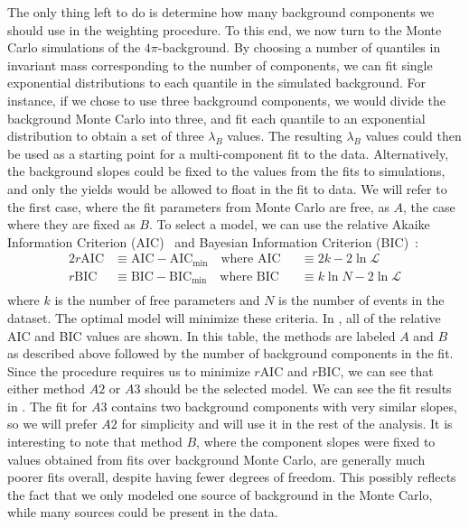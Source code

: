 The only thing left to do is determine how many background components we should use in the weighting procedure. To this end, we now turn to the Monte Carlo simulations of the $4\pi$-background. By choosing a number of quantiles in invariant mass corresponding to the number of components, we can fit single exponential distributions to each quantile in the simulated background. For instance, if we chose to use three background components, we would divide the background Monte Carlo into three, and fit each quantile to an exponential distribution to obtain a set of three $\lambda_B$ values. The resulting  $\lambda_B$ values could then be used as a starting point for a multi-component fit to the data. Alternatively, the background slopes could be fixed to the values from the fits to simulations, and only the yields would be allowed to float in the fit to data. We will refer to the first case, where the fit parameters from Monte Carlo are free, as $A$, the case where they are fixed as $B$. To select a model, we can use the relative Akaike Information Criterion (AIC)~\cite{Akaike1998} and Bayesian Information Criterion (BIC)~\cite{Schwarz1978}:
\begin{alignat}{2}
  r\text{AIC} &\equiv \text{AIC} - \text{AIC}_\text{min} \quad\text{where } \text{AIC} &&\equiv 2k - 2\ln\mathcal{L} \\
  r\text{BIC} &\equiv \text{BIC} - \text{BIC}_\text{min} \quad\text{where } \text{BIC} &&\equiv k\ln{N} - 2\ln\mathcal{L} \\
  \label{eq:information-criteria}
\end{alignat}
where $k$ is the number of free parameters and $N$ is the number of events in the dataset. The optimal model will minimize these criteria. In , all of the relative AIC and BIC values are shown. In this table, the methods are labeled $A$ and $B$ as described above followed by the number of background components in the fit. Since the procedure requires us to minimize $r\text{AIC}$ and $r\text{BIC}$, we can see that either method $A2$ or $A3$ should be the selected model. We can see the fit results in . The fit for $A3$ contains two background components with very similar slopes, so we will prefer $A2$ for simplicity and will use it in the rest of the analysis. It is interesting to note that method $B$, where the component slopes were fixed to values obtained from fits over background Monte Carlo, are generally much poorer fits overall, despite having fewer degrees of freedom. This possibly reflects the fact that we only modeled one source of background in the Monte Carlo, while many sources could be present in the data.

